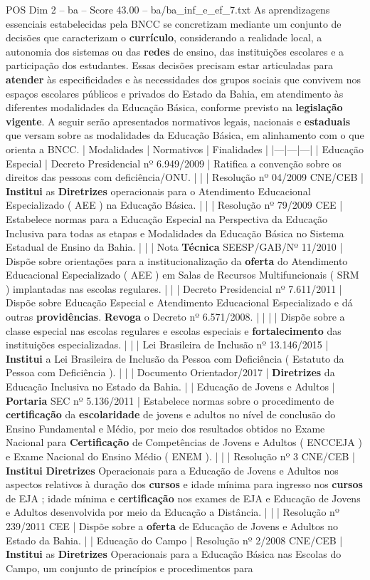 \begin{textsample}{POS Dim 2 – ba – Score 43.00 – ba/ba\_inf\_e\_ef\_7.txt}
As aprendizagens essenciais estabelecidas pela BNCC se concretizam mediante um conjunto de decisões que caracterizam o \textbf{currículo}, considerando a realidade local, a autonomia dos sistemas ou das \textbf{redes} de ensino, das instituições escolares e a participação dos estudantes.
Essas decisões precisam estar articuladas para \textbf{atender} às especificidades e às necessidades dos grupos sociais que convivem nos espaços escolares públicos e privados do Estado da Bahia, em atendimento às diferentes modalidades da Educação Básica, conforme previsto na \textbf{legislação} \textbf{vigente}.
A seguir serão apresentados normativos legais, nacionais e \textbf{estaduais} que versam sobre as modalidades da Educação Básica, em alinhamento com o que orienta a BNCC. | Modalidades | Normativos | Finalidades | |---|---|---| | Educação Especial | Decreto Presidencial nº 6.949/2009 | Ratifica a convenção sobre os direitos das pessoas com deficiência/ONU. | | | Resolução nº 04/2009 CNE/CEB | \textbf{Institui} as \textbf{Diretrizes} operacionais para o Atendimento Educacional Especializado ( AEE ) na Educação Básica. | | | Resolução nº 79/2009 CEE | Estabelece normas para a Educação Especial na Perspectiva da Educação Inclusiva para todas as etapas e Modalidades da Educação Básica no Sistema Estadual de Ensino da Bahia. | | | Nota \textbf{Técnica} SEESP/GAB/Nº 11/2010 | Dispõe sobre orientações para a institucionalização da \textbf{oferta} do Atendimento Educacional Especializado ( AEE ) em Salas de Recursos Multifuncionais ( SRM ) implantadas nas escolas regulares. | | | Decreto Presidencial nº 7.611/2011 | Dispõe sobre Educação Especial e Atendimento Educacional Especializado e dá outras \textbf{providências}. \textbf{Revoga} o Decreto nº 6.571/2008. | | | | Dispõe sobre a classe especial nas escolas regulares e escolas especiais e \textbf{fortalecimento} das instituições especializadas. | | | Lei Brasileira de Inclusão nº 13.146/2015 | \textbf{Institui} a Lei Brasileira de Inclusão da Pessoa com Deficiência ( Estatuto da Pessoa com Deficiência ). | | | Documento Orientador/2017 | \textbf{Diretrizes} da Educação Inclusiva no Estado da Bahia. | | Educação de Jovens e Adultos | \textbf{Portaria} SEC nº 5.136/2011 | Estabelece normas sobre o procedimento de \textbf{certificação} da \textbf{escolaridade} de jovens e adultos no nível de conclusão do Ensino Fundamental e Médio, por meio dos resultados obtidos no Exame Nacional para \textbf{Certificação} de Competências de Jovens e Adultos ( ENCCEJA ) e Exame Nacional do Ensino Médio ( ENEM ). | | | Resolução nº 3 CNE/CEB | \textbf{Institui} \textbf{Diretrizes} Operacionais para a Educação de Jovens e Adultos nos aspectos relativos à duração dos \textbf{cursos} e idade mínima para ingresso nos \textbf{cursos} de EJA ; idade mínima e \textbf{certificação} nos exames de EJA e Educação de Jovens e Adultos desenvolvida por meio da Educação a Distância. | | | Resolução nº 239/2011 CEE | Dispõe sobre a \textbf{oferta} de Educação de Jovens e Adultos no Estado da Bahia. | | Educação do Campo | Resolução nº 2/2008 CNE/CEB | \textbf{Institui} as \textbf{Diretrizes} Operacionais para a Educação Básica nas Escolas do Campo, um conjunto de princípios e procedimentos para 
\end{textsample}
